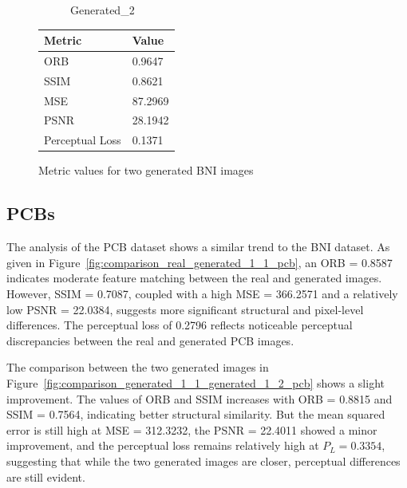 \documentclass[12pt,DIV14,BCOR12mm,a4paper,footinclude=false,headinclude,parskip=half-,twoside,openright,cleardoublepage=empty,toc=index,bibliography=totoc,listof=totoc]{scrreprt}
\numberwithin{equation}{chapter}
\begin{document}
\begin{figure}
\begin{minipage}[H]{\linewidth}
\begin{minipage}[H]{0.5\linewidth}
\begin{subfigure}[t]{0.48\linewidth}
                \caption{Generated\_2}
            \end{subfigure}
        \end{minipage}%
        \hfill
        \begin{minipage}[H]{0.5\linewidth} %
            \centering
            \small
            \begin{tabular}{p{3cm} p{2cm}}
                \toprule
                \textbf{Metric} & \textbf{Value} \\
                \midrule
                ORB             & 0.9647        \\
                SSIM            & 0.8621        \\
                MSE             & 87.2969       \\
                PSNR            & 28.1942       \\
                Perceptual Loss & 0.1371        \\
                \bottomrule
            \end{tabular}
        \end{minipage}%
        \caption{Metric values for two generated BNI images}
        \label{fig:comparison_generated_1_1_generated_1_2_bni}
    \end{minipage}
\end{figure}


\subsection{PCBs}

The analysis of the PCB dataset shows a similar trend to the BNI dataset. As given in Figure~\ref{fig:comparison_real_generated_1_1_pcb}, an ORB = 0.8587 indicates moderate feature matching between the real and generated images. However, SSIM = 0.7087, coupled with a high MSE = 366.2571 and a relatively low PSNR = 22.0384, suggests more significant structural and pixel-level differences. The perceptual loss of 0.2796 reflects noticeable perceptual discrepancies between the real and generated PCB images.

The comparison between the two generated images in Figure~\ref{fig:comparison_generated_1_1_generated_1_2_pcb} shows a slight improvement. The values of ORB and SSIM increases with ORB = 0.8815 and SSIM = 0.7564, indicating better structural similarity. But the mean squared error is still high at MSE = 312.3232, the PSNR = 22.4011 showed a minor improvement, and the perceptual loss remains relatively high at \( P_L = 0.3354 \), suggesting that while the two generated images are closer, perceptual differences are still evident.
\end{document}
